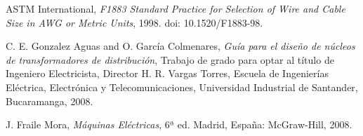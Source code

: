 \documentclass[conference]{IEEEtran}
\theoremstyle{mytheoremstyle}
\theoremstyle{mytheoremstyle}
\theoremstyle{myproblemstyle}
\begin{document}

            




        \begin{thebibliography}{1}
            
            ASTM International, \emph{F1883 Standard Practice for Selection of Wire and Cable Size in AWG or Metric Units}, 1998. doi: 10.1520/F1883-98.
            \label{F1883}

            C. E. Gonzalez Aguas and O. García Colmenares, \emph{Guía para el diseño de núcleos de transformadores de distribución}, Trabajo de grado para optar al título de Ingeniero Electricista, Director H. R. Vargas Torres, Escuela de Ingenierías Eléctrica, Electrónica y Telecomunicaciones, Universidad Industrial de Santander, Bucaramanga, 2008.
            \label{GonzalezGarcía2008}

            J. Fraile Mora, \emph{Máquinas Eléctricas}, 6ª ed. Madrid, España: McGraw-Hill, 2008.
            \label{Fraile2008}

        \end{thebibliography}

        
\end{document}
